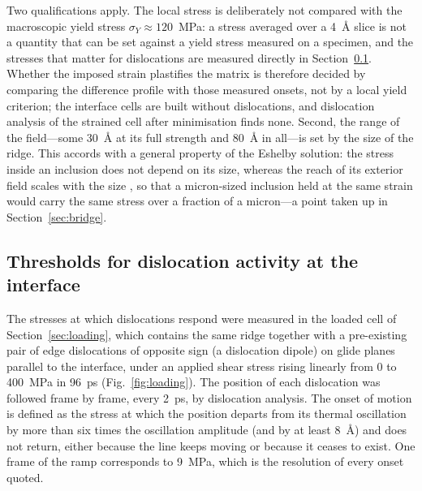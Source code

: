 Two qualifications apply. The local stress is deliberately not compared
with the macroscopic yield stress $\sigma_Y\approx120$~MPa: a stress
averaged over a 4~\AA{} slice is not a quantity that can be set against a
yield stress measured on a specimen, and the stresses that matter for
dislocations are measured directly in Section~\ref{sec:thresholds}. Whether
the imposed strain plastifies the matrix is therefore decided by comparing
the difference profile with those measured onsets, not by a local yield
criterion; the interface cells are built without dislocations, and dislocation
analysis of the strained cell after minimisation finds none.
Second, the range of the field---some 30~\AA{} at its full strength and
80~\AA{} in all---is set by the size of the ridge. This accords with a
general property of the Eshelby solution: the stress inside an inclusion
does not depend on its size, whereas the reach of its exterior field scales
with the size \cite{Eshelby1957}, so that a micron-sized inclusion held at
the same strain would carry the same stress over a fraction of a micron---a
point taken up in Section~\ref{sec:bridge}.

\subsection{Thresholds for dislocation activity at the interface}
\label{sec:thresholds}

The stresses at which dislocations respond were measured in the loaded cell
of Section~\ref{sec:loading}, which contains the same ridge together with a
pre-existing pair of edge dislocations of opposite sign (a dislocation
dipole) on glide planes parallel to the interface, under an applied shear
stress rising linearly from 0 to 400~MPa in 96~ps (Fig.~\ref{fig:loading}).
The position of each dislocation was followed frame by frame, every 2~ps, by
dislocation analysis. The onset of motion is defined as the stress at which
the position departs from its thermal oscillation by more than six times the
oscillation amplitude (and by at least 8~\AA{}) and does not return, either
because the line keeps moving or because it ceases to exist. One frame of the
ramp corresponds to 9~MPa, which is the resolution of every onset quoted.

